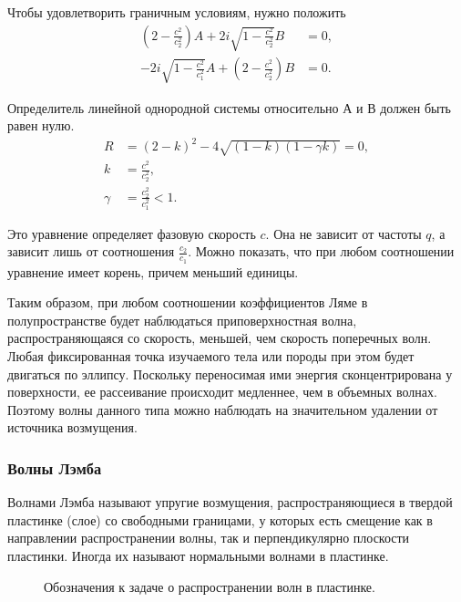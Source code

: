 Чтобы удовлетворить граничным условиям, нужно положить
\begin{align}
(2-\frac{c^2}{c_2^2})A + 2i\sqrt{1-\frac{c^2}{c_2^2}}B &= 0, \nonumber\\
-2i\sqrt{1-\frac{c^2}{c_1^2}}A + (2-\frac{c^2}{c_2^2})B &= 0.
\end{align}

Определитель линейной однородной системы относительно А и В должен быть равен нулю.
\begin{align}
R &= (2-k)^2 - 4\sqrt{(1-k)(1-\gamma k)} = 0, \nonumber\\
k &= \frac{c^2}{c_2^2}, \nonumber\\
\gamma &= \frac{c_2^2}{c_1^2} < 1.
\end{align}

Это уравнение определяет фазовую скорость $c$. Она не зависит от частоты $q$, а зависит лишь от соотношения $\frac{c_2}{c_1}$. Можно показать, что при любом соотношении уравнение имеет корень, причем меньший единицы.

Таким образом, при любом соотношении коэффициентов Ляме в полупространстве будет наблюдаться приповерхностная волна, распространяющаяся со скорость, меньшей, чем скорость поперечных волн. Любая фиксированная точка изучаемого тела или породы при этом будет двигаться по эллипсу. Поскольку переносимая ими энергия сконцентрирована у поверхности, ее рассеивание происходит медленнее, чем в объемных волнах. Поэтому волны данного типа можно наблюдать на значительном удалении от источника возмущения.


\subsubsection{Волны Лэмба}

Волнами Лэмба называют упругие возмущения, распространяющиеся в твердой пластинке (слое) со свободными границами, у которых есть смещение как в направлении распространении волны, так и перпендикулярно плоскости пластинки. Иногда их называют нормальными волнами в пластинке.

\begin{figure}[h]
\caption{Обозначения к задаче о распространении волн в пластинке.}
\end{figure}

